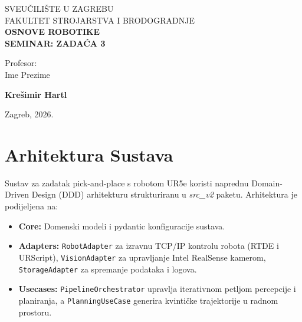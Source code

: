 \documentclass[12pt,a4paper]{article}
\begin{document}
\begin{titlepage}
    \thispagestyle{empty}
    \centering
    {\fontsize{16pt}{19pt}\selectfont SVEUČILIŠTE U ZAGREBU\\}
    {\fontsize{16pt}{19pt}\selectfont FAKULTET STROJARSTVA I BRODOGRADNJE\\}
    \vfill
    {\fontsize{28pt}{34pt}\selectfont\bfseries OSNOVE ROBOTIKE\\}
    \vspace{0.5cm}
    {\fontsize{28pt}{34pt}\selectfont\bfseries SEMINAR: ZADAĆA 3\\}
    \vfill
    \noindent
    \begin{minipage}[t]{0.48\textwidth}
        \raggedright
        {\fontsize{14pt}{17pt}\selectfont Profesor:\\}
        {\fontsize{14pt}{17pt}\selectfont Ime Prezime\\}
    \end{minipage}
    \hfill
    \begin{minipage}[t]{0.48\textwidth}
        \raggedleft
        {\fontsize{14pt}{17pt}\selectfont\bfseries Krešimir Hartl\\}
    \end{minipage}
    \vspace{1cm}
    \begin{center}
        {\fontsize{14pt}{17pt}\selectfont Zagreb, 2026.}
    \end{center}
\end{titlepage}

\tableofcontents
\newpage
\listoffigures
\newpage


\section{Arhitektura Sustava}
Sustav za zadatak pick-and-place s robotom UR5e koristi naprednu Domain-Driven Design (DDD) arhitekturu strukturiranu u \textit{src\_v2} paketu. Arhitektura je podijeljena na:
\begin{itemize}
    \item \textbf{Core:} Domenski modeli i pydantic konfiguracije sustava.
    \item \textbf{Adapters:} \texttt{RobotAdapter} za izravnu TCP/IP kontrolu robota (RTDE i URScript), \texttt{VisionAdapter} za upravljanje Intel RealSense kamerom, \texttt{StorageAdapter} za spremanje podataka i logova.
    \item \textbf{Usecases:} \texttt{PipelineOrchestrator} upravlja iterativnom petljom percepcije i planiranja, a \texttt{PlanningUseCase} generira kvintičke trajektorije u radnom prostoru.
\end{itemize}
\end{document}

